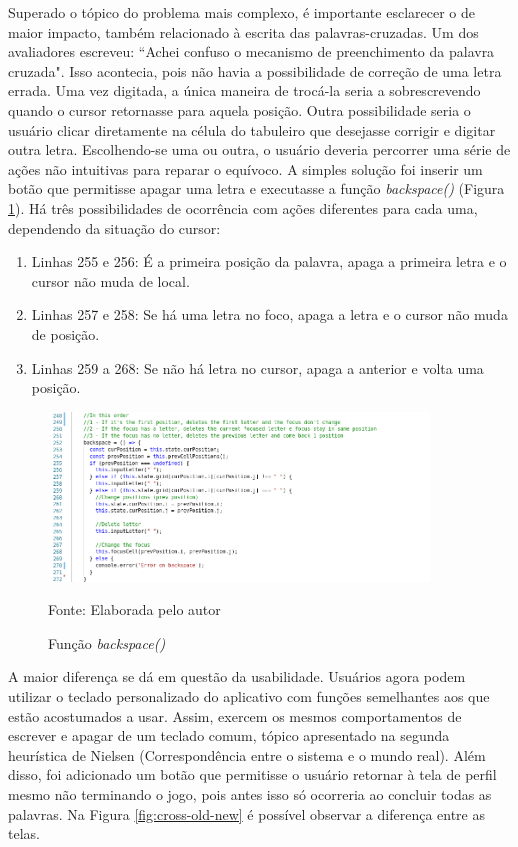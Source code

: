 Superado o tópico do problema mais complexo, é importante esclarecer o de maior impacto, também relacionado à escrita das palavras-cruzadas.
Um dos avaliadores escreveu: ``Achei confuso o mecanismo de preenchimento da palavra cruzada". Isso acontecia, pois não havia a possibilidade de correção de uma letra errada. Uma vez digitada, a única maneira de trocá-la seria a sobrescrevendo quando o cursor retornasse para aquela posição. Outra possibilidade seria o usuário clicar diretamente na célula do tabuleiro que desejasse corrigir e digitar outra letra. Escolhendo-se uma ou outra, o usuário deveria percorrer uma série de ações não intuitivas para reparar o equívoco. A simples solução foi inserir um botão que permitisse apagar uma letra e executasse a função \textit{backspace()} (Figura \ref{fig:backspace}). Há três possibilidades de ocorrência com ações diferentes para cada uma, dependendo da situação do cursor:
\begin{enumerate}
    \item Linhas 255 e 256: É a primeira posição da palavra, apaga a primeira letra e o cursor não muda de local.
    \item Linhas 257 e 258: Se há uma letra no foco, apaga a letra e o cursor não muda de posição.
    \item Linhas 259 a 268: Se não há letra no cursor, apaga a anterior e volta uma posição.
\end{enumerate}

\begin{figure}[H]
\centering
    \caption{Função \textit{backspace()}}
    \label{fig:backspace}
    \includegraphics[width=0.9\textwidth]{Figuras/codeBackspace.png}
    
    Fonte: Elaborada pelo autor
\end{figure}

A maior diferença se dá em questão da usabilidade. Usuários agora podem utilizar o teclado personalizado do aplicativo com funções semelhantes aos que estão acostumados a usar. Assim, exercem os mesmos comportamentos de escrever e apagar de um teclado comum, tópico apresentado na segunda heurística de Nielsen (Correspondência entre o sistema e o mundo real).
Além disso, foi adicionado um botão que permitisse o usuário retornar à tela de perfil mesmo não terminando o jogo, pois antes isso só ocorreria ao concluir todas as palavras. Na Figura \ref{fig:cross-old-new} é possível observar a diferença entre as telas.

